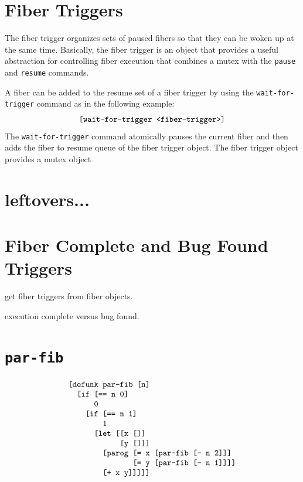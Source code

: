 \section{Fiber Triggers}

The fiber trigger organizes sets of paused fibers so that they can be
woken up at the same time.  Basically, the fiber trigger is an object
that provides a useful abstraction for controlling fiber execution
that combines a mutex with the {\tt pause} and {\tt resume} commands.

A fiber can be added to the resume set of a fiber trigger by using the
{\tt wait-for-trigger} command as in the following example:
\begin{equation*}
\text{\tt [wait-for-trigger <fiber-trigger>]}
\end{equation*}
The {\tt wait-for-trigger} command atomically pauses the current fiber
and then adds the fiber to resume queue of the fiber trigger object.  The fiber trigger object provides a mutex object 

\section{leftovers...}

\section{Fiber Complete and Bug Found Triggers}

get fiber triggers from fiber objects.

execution complete versus bug found.


\section{{\tt par-fib}}

\begin{equation*}
\begin{array}{l}
\text{\tt [defunk par-fib [n]} \\
\text{\tt ~~[if [== n 0]} \\
\text{\tt ~~~~~~0} \\
\text{\tt ~~~~[if [== n 1]} \\
\text{\tt ~~~~~~~~1} \\
\text{\tt ~~~~~~[let [[x []]} \\
\text{\tt ~~~~~~~~~~~~[y []]]} \\
\text{\tt ~~~~~~~~[parog [= x [par-fib [- n 2]]]} \\
\text{\tt ~~~~~~~~~~~~~~~[= y [par-fib [- n 1]]]]} \\
\text{\tt ~~~~~~~~[+ x y]]]]]}
\end{array}
\end{equation*}


